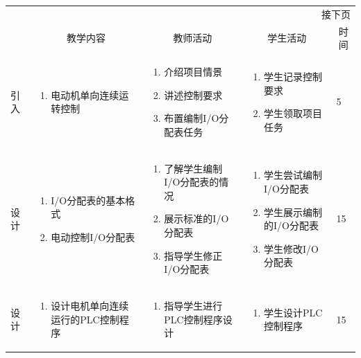 {\begin{landscape}
\begin{longtable}{|m{10mm}|m{50mm}|m{50mm}|m{50mm}|m{15mm}|}
\multicolumn{5}{r}{\small 接下页}\\
\endfoot
\hline
\endlastfoot
\multicolumn{1}{|c|}{步骤}&\multicolumn{1}{c|}{教学内容}&\multicolumn{1}{c|}{教师活动}&\multicolumn{1}{c|}{学生活动}&\multicolumn{1}{c|}{时间}\\\hline
引入&\begin{enumerate}
\item 电动机单向连续运转控制
\end{enumerate} &\begin{enumerate}
\item 介绍项目情景
\item 讲述控制要求
\item 布置编制I/O分配表任务
\end{enumerate} &\begin{enumerate}
\item 学生记录控制要求
\item 学生领取项目任务
\end{enumerate} &5 \\\hline
设计&
\begin{enumerate}
\item I/O分配表的基本格式
\item 电动控制I/O分配表
\end{enumerate} &\begin{enumerate}
\item 了解学生编制I/O分配表的情况
\item 展示标准的I/O分配表
\item 指导学生修正I/O分配表
\end{enumerate} &\begin{enumerate}
\item 学生尝试编制I/O分配表
\item 学生展示编制的I/O分配表
\item 学生修改I/O分配表
\end{enumerate} &15 \\\hline
设计&\begin{enumerate}
\item 设计电机单向连续运行的PLC控制程序
\end{enumerate}
&\begin{enumerate}
\item 指导学生进行PLC控制程序设计
\end{enumerate} &\begin{enumerate}
\item 学生设计PLC控制程序
\end{enumerate} &15 \\\hline

\end{longtable}
\end{landscape}}
